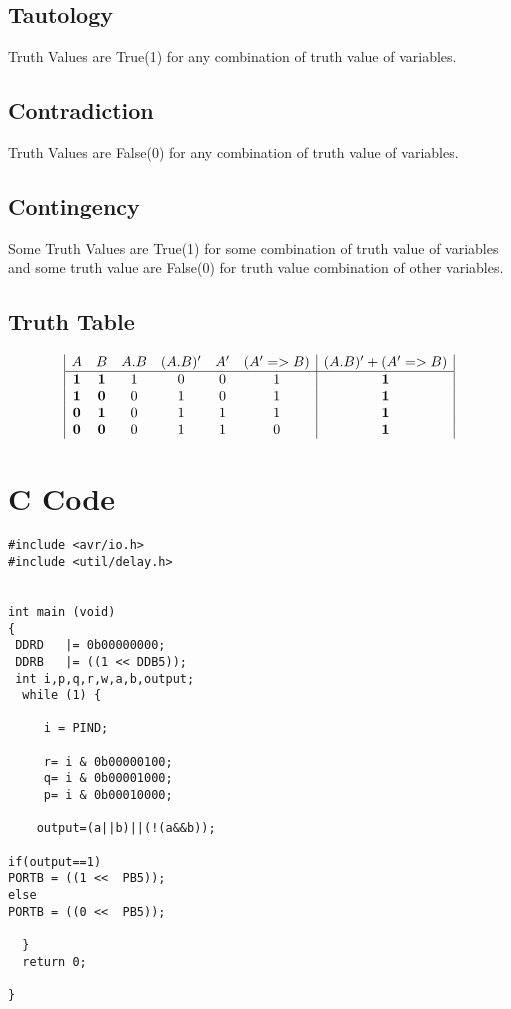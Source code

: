 \documentclass{article}
\begin{document}
\subsection{Tautology}
Truth Values are True(1) for any combination of truth value of variables.

\subsection{Contradiction}
Truth Values are False(0) for any combination of truth value of variables.

\subsection{Contingency}
Some Truth Values are True(1) for some combination of truth value of variables and some truth value are False(0) for  truth value combination of other variables.


\subsection{Truth Table}
\begin{displaymath}
\begin{array}{|c c c c c c|c|}
A & B & A . B & (A . B)' &  A' & (A' => B ) &  (A . B)'+( A' => B) \\ %
\hline %
\textbf{1} & \textbf{1} & 1 & 0 & 0 & 1 & \textbf{1}\\
\textbf{1} & \textbf{0} & 0 & 1 & 0 & 1 & \textbf{1}\\
\textbf{0} & \textbf{1} & 0 & 1 & 1 & 1 & \textbf{1}\\
\textbf{0} & \textbf{0} & 0 & 1 & 1 & 0 & \textbf{1}\\
\end{array}
\end{displaymath}

\section{C Code}
\begin{verbatim}
#include <avr/io.h>
#include <util/delay.h>

 
int main (void)
{
 DDRD   |= 0b00000000;
 DDRB   |= ((1 << DDB5));
 int i,p,q,r,w,a,b,output;
  while (1) {

     i = PIND;
   
     r= i & 0b00000100;
     q= i & 0b00001000;
     p= i & 0b00010000;

	output=(a||b)||(!(a&&b));

if(output==1)
PORTB = ((1 <<  PB5));
else
PORTB = ((0 <<  PB5));

  }
  return 0;

}
\end{verbatim}
\end{document}

